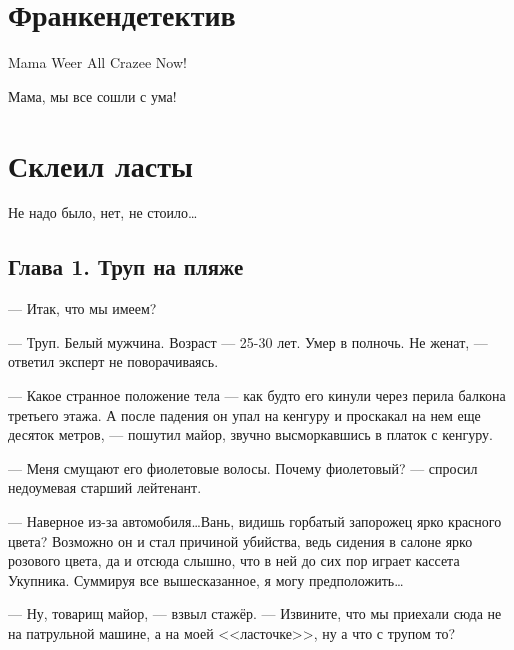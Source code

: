\section{Франкендетектив} %
\begin{epigraph}
    Mama Weer All Crazee Now!
\end{epigraph}
\begin{epigraph}
    Мама, мы все сошли с ума!
\end{epigraph}

\section*{Склеил ласты}
\begin{epigraph}
Не надо было, нет, не стоило\ldots
{}
\end{epigraph}

\subsection*{Глава 1. Труп на пляже}
--- Итак, что мы имеем?

--- Труп. Белый мужчина. Возраст --- 25-30 лет. Умер в полночь. Не женат, --- ответил эксперт не поворачиваясь.

--- Какое странное положение тела --- как будто его кинули через перила балкона третьего этажа. А после падения он упал на кенгуру и проскакал на нем еще десяток метров, --- пошутил майор, звучно высморкавшись в платок с кенгуру.

--- Меня смущают его фиолетовые волосы. Почему фиолетовый? --- спросил недоумевая старший лейтенант.

--- Наверное из-за автомобиля\ldots Вань, видишь горбатый запорожец ярко красного цвета? Возможно он и стал причиной убийства, ведь сидения в салоне ярко розового цвета, да и отсюда слышно, что в ней до сих пор играет кассета Укупника. Суммируя все вышесказанное, я могу предположить\ldots

--- Ну, товарищ майор, --- взвыл стажёр. --- Извините, что мы приехали сюда не на патрульной машине, а на моей <<ласточке>>, ну а что с трупом то?

